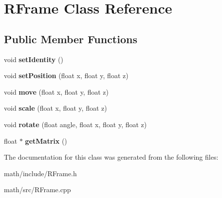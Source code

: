 \hypertarget{classRFrame}{
\section{RFrame Class Reference}
\label{classRFrame}
}
\subsection*{Public Member Functions}
\begin{DoxyCompactItemize}
\item 
\hypertarget{classRFrame_aa925b91df1ddc68b1a6c1a5cc3bbad9a}{
void {\bfseries setIdentity} ()}
\label{classRFrame_aa925b91df1ddc68b1a6c1a5cc3bbad9a}

\item 
\hypertarget{classRFrame_a8a881dd99cdaed03a7c9df538a1a3d44}{
void {\bfseries setPosition} (float x, float y, float z)}
\label{classRFrame_a8a881dd99cdaed03a7c9df538a1a3d44}

\item 
\hypertarget{classRFrame_a9e5f303d1e292f7d2c4e4395ad40f846}{
void {\bfseries move} (float x, float y, float z)}
\label{classRFrame_a9e5f303d1e292f7d2c4e4395ad40f846}

\item 
\hypertarget{classRFrame_abdc72d6aa2057af096dcfb5fca98020c}{
void {\bfseries scale} (float x, float y, float z)}
\label{classRFrame_abdc72d6aa2057af096dcfb5fca98020c}

\item 
\hypertarget{classRFrame_a6d78d899004ce9cfdefdcae5bd5efc35}{
void {\bfseries rotate} (float angle, float x, float y, float z)}
\label{classRFrame_a6d78d899004ce9cfdefdcae5bd5efc35}

\item 
\hypertarget{classRFrame_a7a7b42fff68985d3059f9df0e2774e63}{
float $\ast$ {\bfseries getMatrix} ()}
\label{classRFrame_a7a7b42fff68985d3059f9df0e2774e63}

\end{DoxyCompactItemize}


The documentation for this class was generated from the following files:\begin{DoxyCompactItemize}
\item 
math/include/RFrame.h\item 
math/src/RFrame.cpp\end{DoxyCompactItemize}
